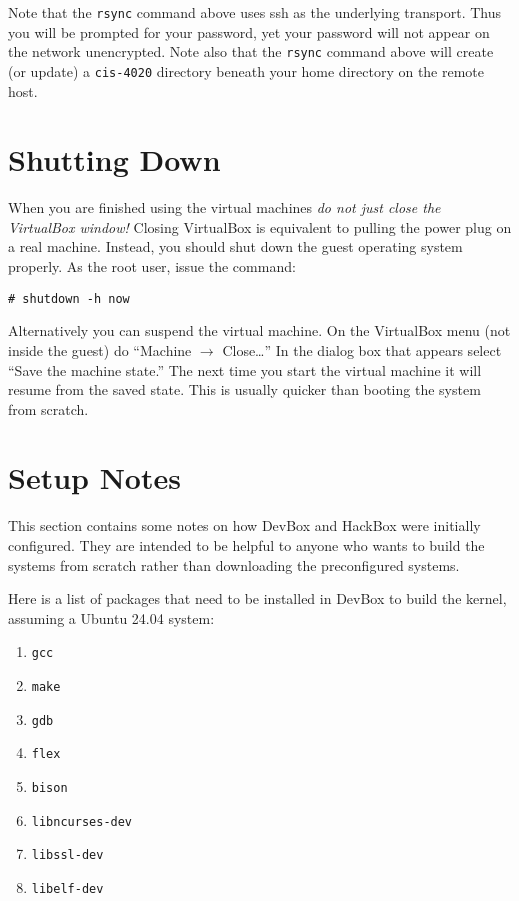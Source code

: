 \documentclass[twocolumn]{article}
\begin{document}
Note that the \texttt{rsync} command above uses ssh as the underlying transport. Thus you will
be prompted for your password, yet your password will not appear on the network unencrypted.
Note also that the \texttt{rsync} command above will create (or update) a \texttt{cis-4020}
directory beneath your home directory on the remote host.

\section{Shutting Down}

When you are finished using the virtual machines \emph{do not just close the VirtualBox window!}
Closing VirtualBox is equivalent to pulling the power plug on a real machine. Instead, you
should shut down the guest operating system properly. As the root user, issue the command:
\begin{Verbatim}
# shutdown -h now
\end{Verbatim}

Alternatively you can suspend the virtual machine. On the VirtualBox menu (not inside the guest)
do ``Machine $\rightarrow$ Close\ldots'' In the dialog box that appears select ``Save the
machine state.'' The next time you start the virtual machine it will resume from the saved
state. This is usually quicker than booting the system from scratch.

\section{Setup Notes}

This section contains some notes on how DevBox and HackBox were initially configured. They are
intended to be helpful to anyone who wants to build the systems from scratch rather than
downloading the preconfigured systems.

Here is a list of packages that need to be installed in DevBox to build the kernel, assuming a
Ubuntu 24.04 system:
\begin{enumerate}
  \item \texttt{gcc}
  \item \texttt{make}
  \item \texttt{gdb}
  \item \texttt{flex}
  \item \texttt{bison}
  \item \texttt{libncurses-dev}
  \item \texttt{libssl-dev}
  \item \texttt{libelf-dev}
\end{enumerate}
\end{document}
